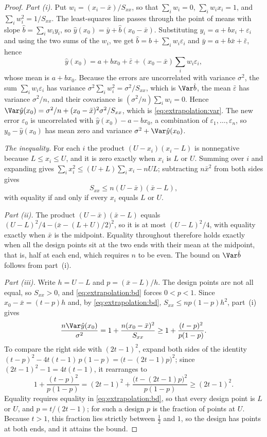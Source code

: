 \begin{refsection}
\begin{proof}
\emph{Part (i).} Put $w_i=(x_i-\bar x)/S_{xx}$, so that $\sum_iw_i=0$, $\sum_iw_ix_i=1$, and $\sum_iw_i^2=1/S_{xx}$. The least-squares line passes through the point of means with slope $\hat b=\sum_iw_iy_i$, so $\hat y(x_0)=\bar y+\hat b(x_0-\bar x)$. Substituting $y_i=a+bx_i+\varepsilon_i$ and using the two sums of the $w_i$, we get $\hat b=b+\sum_iw_i\varepsilon_i$ and $\bar y=a+b\bar x+\bar\varepsilon$, hence
\[
\hat y(x_0)=a+bx_0+\bar\varepsilon+(x_0-\bar x)\sum_iw_i\varepsilon_i ,
\]
whose mean is $a+bx_0$. Because the errors are uncorrelated with variance $\sigma^2$, the sum $\sum_iw_i\varepsilon_i$ has variance $\sigma^2\sum_iw_i^2=\sigma^2/S_{xx}$, which is $\Var\hat b$, the mean $\bar\varepsilon$ has variance $\sigma^2/n$, and their covariance is $(\sigma^2/n)\sum_iw_i=0$. Hence $\Var\hat y(x_0)=\sigma^2/n+(x_0-\bar x)^2\sigma^2/S_{xx}$, which is \eqref{eq:extrapolation:var}. The new error $\varepsilon_0$ is uncorrelated with $\hat y(x_0)-a-bx_0$, a combination of $\varepsilon_1,\dots,\varepsilon_n$, so $y_0-\hat y(x_0)$ has mean zero and variance $\sigma^2+\Var\hat y(x_0)$.

\emph{The inequality.} For each $i$ the product $(U-x_i)(x_i-L)$ is nonnegative because $L\le x_i\le U$, and it is zero exactly when $x_i$ is $L$ or $U$. Summing over $i$ and expanding gives $\sum_ix_i^2\le(U+L)\sum_ix_i-nUL$; subtracting $n\bar x^2$ from both sides gives
\begin{equation}\label{eq:extrapolation:bd}
S_{xx}\le n(U-\bar x)(\bar x-L),
\end{equation}
with equality if and only if every $x_i$ equals $L$ or $U$.

\emph{Part (ii).} The product $(U-\bar x)(\bar x-L)$ equals $(U-L)^2/4-\bigl(\bar x-(L+U)/2\bigr)^2$, so it is at most $(U-L)^2/4$, with equality exactly when $\bar x$ is the midpoint. Equality throughout therefore holds exactly when all the design points sit at the two ends with their mean at the midpoint, that is, half at each end, which requires $n$ to be even. The bound on $\Var\hat b$ follows from part~(i).

\emph{Part (iii).} Write $h=U-L$ and $p=(\bar x-L)/h$. The design points are not all equal, so $S_{xx}>0$, and \eqref{eq:extrapolation:bd} forces $0<p<1$. Since $x_0-\bar x=(t-p)h$ and, by \eqref{eq:extrapolation:bd}, $S_{xx}\le np(1-p)h^2$, part~(i) gives
\[
\frac{n\Var\hat y(x_0)}{\sigma^2}=1+\frac{n(x_0-\bar x)^2}{S_{xx}}\ge1+\frac{(t-p)^2}{p(1-p)}.
\]
To compare the right side with $(2t-1)^2$, expand both sides of the identity $(t-p)^2-4t(t-1)\,p(1-p)=\bigl(t-(2t-1)p\bigr)^2$; since $(2t-1)^2-1=4t(t-1)$, it rearranges to
\[
1+\frac{(t-p)^2}{p(1-p)}=(2t-1)^2+\frac{\bigl(t-(2t-1)p\bigr)^2}{p(1-p)}\ge(2t-1)^2 .
\]
Equality requires equality in \eqref{eq:extrapolation:bd}, so that every design point is $L$ or $U$, and $p=t/(2t-1)$; for such a design $p$ is the fraction of points at $U$. Because $t>1$, this fraction lies strictly between $\tfrac12$ and $1$, so the design has points at both ends, and it attains the bound.
\end{proof}


\end{refsection}
